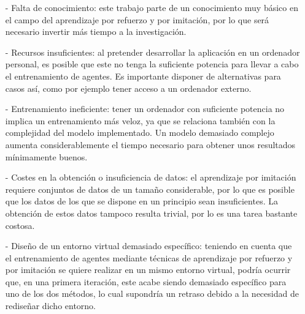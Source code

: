 \begin{enumerate}
    \item[-] Falta de conocimiento: este trabajo parte de un conocimiento muy básico en el campo del aprendizaje por refuerzo y por imitación, por lo que será necesario invertir más tiempo a la investigación.
    \item[-] Recursos insuficientes: al pretender desarrollar la aplicación en un ordenador personal, es posible que este no tenga la suficiente potencia para llevar a cabo el entrenamiento de agentes. Es importante disponer de alternativas para casos así, como por ejemplo tener acceso a un ordenador externo.
    \item[-] Entrenamiento ineficiente: tener un ordenador con suficiente potencia no implica un entrenamiento más veloz, ya que se relaciona también con la complejidad del modelo implementado. Un modelo demasiado complejo aumenta considerablemente el tiempo necesario para obtener unos resultados mínimamente buenos.
    \item[-] Costes en la obtención o insuficiencia de datos: el aprendizaje por imitación requiere conjuntos de datos de un tamaño considerable, por lo que es posible que los datos de los que se dispone en un principio sean insuficientes. La obtención de estos datos tampoco resulta trivial, por lo es una tarea bastante costosa.
    \item[-] Diseño de un entorno virtual demasiado específico: teniendo en cuenta que el entrenamiento de agentes mediante técnicas de aprendizaje por refuerzo y por imitación se quiere realizar en un mismo entorno virtual, podría ocurrir que, en una primera iteración, este acabe siendo demasiado específico para uno de los dos métodos, lo cual supondría un retraso debido a la necesidad de rediseñar dicho entorno.
    
\end{enumerate}